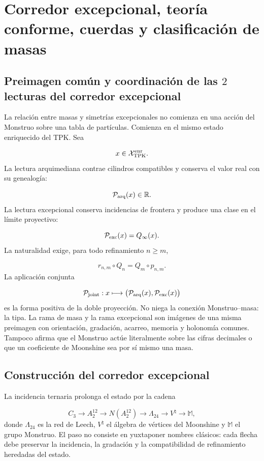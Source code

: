 \section{Corredor excepcional, teoría conforme, cuerdas y clasificación de masas}
\subsection{Preimagen común y coordinación de las \(2\) lecturas del corredor excepcional}
La relación entre masas y simetrías excepcionales no comienza en una acción del Monstruo sobre una tabla de partículas. Comienza en el mismo estado enriquecido del TPK. Sea

\[
x\in\mathcal X_{\rm TPK}^{\rm enr}.
\]
La lectura arquimediana contrae cilindros compatibles y conserva el valor real con su genealogía:

\[
\mathcal P_{\rm arq}(x)\in\mathbb R.
\]
La lectura excepcional conserva incidencias de frontera y produce una clase en el límite proyectivo:

\[
\mathcal P_{\rm exc}(x)=Q_\infty(x).
\]
La naturalidad exige, para todo refinamiento \(n\ge m\),

\[
r_{n,m}\circ Q_n=Q_m\circ p_{n,m}.
\]
La aplicación conjunta

\[
\mathcal P_{\rm joint}:x\longmapsto
\bigl(\mathcal P_{\rm arq}(x),\mathcal P_{\rm exc}(x)\bigr)
\]
es la forma positiva de la doble proyección. No niega la conexión Monstruo--masa: la tipa. La rama de masa y la rama excepcional son imágenes de una misma preimagen con orientación, gradación, acarreo, memoria y holonomía comunes. Tampoco afirma que el Monstruo actúe literalmente sobre las cifras decimales o que un coeficiente de Moonshine sea por sí mismo una masa.

\subsection{Construcción del corredor excepcional}
La incidencia ternaria prolonga el estado por la cadena

\[
C_3
\longrightarrow A_2^{12}
\longrightarrow N(A_2^{12})
\longrightarrow \Lambda_{24}
\longrightarrow V^\natural
\longrightarrow \mathbb M,
\]
donde \(\Lambda_{24}\) es la red de Leech, \(V^\natural\) el álgebra de vértices del Moonshine y \(\mathbb M\) el grupo Monstruo. El paso no consiste en yuxtaponer nombres clásicos: cada flecha debe preservar la incidencia, la gradación y la compatibilidad de refinamiento heredadas del estado.

